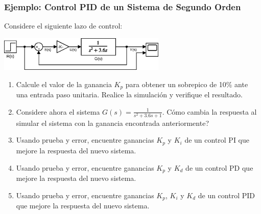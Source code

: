 \documentclass[aspectratio=169,handout]{beamer}
\theoremstyle{definition}
\theoremstyle{plain}
\theoremstyle{remark}
\begin{document}
\begin{frame}[c]\frametitle{Ejemplo: Control PID de un Sistema de Segundo Orden}
\footnotesize
Considere el siguiente lazo de control:
\begin{center}
  \includegraphics[width=8cm]{images/example2.eps}
\end{center}
\vspace*{-5mm}
\begin{enumerate}
  \item Calcule el valor de la ganancia $K_p$ para obtener un sobrepico de 10\% ante una entrada paso unitaria. Realice la simulación y verifique el resultado.
  \item Considere ahora el sistema $G(s) = \frac{1}{s^2 + 3.6s + 1}$. Cómo cambia la respuesta al simular el sistema con la ganancia encontrada anteriormente?
  \item Usando prueba y error, encuentre ganancias $K_p$ y $K_i$ de un control PI que mejore la respuesta del nuevo sistema.
  \item Usando prueba y error, encuentre ganancias $K_p$ y $K_d$ de un control PD que mejore la respuesta del nuevo sistema.
  \item Usando prueba y error, encuentre ganancias $K_p$, $K_i$ y $K_d$ de un control PID que mejore la respuesta del nuevo sistema.
\end{enumerate}
\end{frame}
\end{document}
